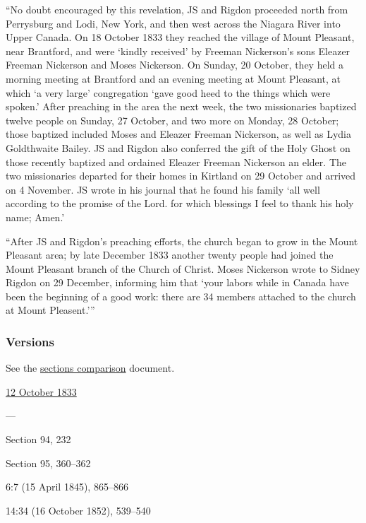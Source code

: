			``No doubt encouraged by this revelation, JS and Rigdon proceeded north from Perrysburg and Lodi, New York, and then west across the Niagara River into Upper Canada. On 18 October 1833 they reached the village of Mount Pleasant, near Brantford, and were `kindly received' by Freeman Nickerson's sons Eleazer Freeman Nickerson and Moses Nickerson. On Sunday, 20 October, they held a morning meeting at Brantford and an evening meeting at Mount Pleasant, at which `a very large' congregation `gave good heed to the things which were spoken.' After preaching in the area the next week, the two missionaries baptized twelve people on Sunday, 27 October, and two more on Monday, 28 October; those baptized included Moses and Eleazer Freeman Nickerson, as well as Lydia Goldthwaite Bailey. JS and Rigdon also conferred the gift of the Holy Ghost on those recently baptized and ordained Eleazer Freeman Nickerson an elder. The two missionaries departed for their homes in Kirtland on 29 October and arrived on 4 November. JS wrote in his journal that he found his family `all well according to the promise of the Lord. for which blessings I feel to thank his holy name; Amen.'
			
			``After JS and Rigdon's preaching efforts, the church began to grow in the Mount Pleasant area; by late December 1833 another twenty people had joined the Mount Pleasant branch of the Church of Christ. Moses Nickerson wrote to Sidney Rigdon on 29 December, informing him that `your labors while in Canada have been the beginning of a good work: there are 34 members attached to the church at Mount Pleasent.'''
				
	\subsubsection{Versions}
		\label{DC100-V}
		
		See the \href{https://drive.google.com/file/d/1goAvNz8jS4R8slYfMG_db55Ty2z_vmgK/view?usp=sharing}{sections comparison} document.
	
		\begin{compactdesc}
			\item[JSP] \hyperref[EMS-1833-JS-12-OCT-1833]{12 October 1833}
			\item[BC] ---
			\item[DC 1835] Section 94, 232
			\item[DC 1844] Section 95, 360--362
			\item[TS] 6:7 (15 April 1845), 865--866
			\item[MS] 14:34 (16 October 1852), 539--540
		\end{compactdesc}

